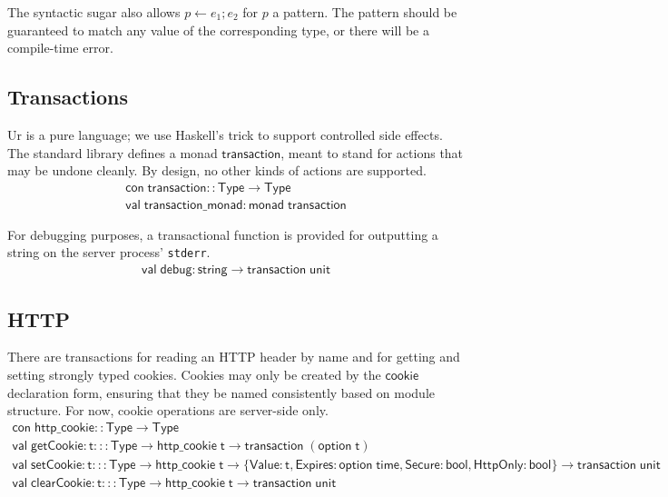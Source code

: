 \documentclass{article}
\newcommand{\mt}[1]{\mathsf{#1}}
\begin{document}
The syntactic sugar also allows $p \leftarrow e_1; e_2$ for $p$ a pattern.  The pattern should be guaranteed to match any value of the corresponding type, or there will be a compile-time error.

\subsection{Transactions}

Ur is a pure language; we use Haskell's trick to support controlled side effects.  The standard library defines a monad $\mt{transaction}$, meant to stand for actions that may be undone cleanly.  By design, no other kinds of actions are supported.
$$\begin{array}{l}
  \mt{con} \; \mt{transaction} :: \mt{Type} \to \mt{Type} \\
  \mt{val} \; \mt{transaction\_monad} : \mt{monad} \; \mt{transaction}
\end{array}$$

For debugging purposes, a transactional function is provided for outputting a string on the server process' \texttt{stderr}.
$$\begin{array}{l}
  \mt{val} \; \mt{debug} : \mt{string} \to \mt{transaction} \; \mt{unit}
\end{array}$$

\subsection{HTTP}

There are transactions for reading an HTTP header by name and for getting and setting strongly typed cookies.  Cookies may only be created by the $\mt{cookie}$ declaration form, ensuring that they be named consistently based on module structure.  For now, cookie operations are server-side only.
$$\begin{array}{l}
  \mt{con} \; \mt{http\_cookie} :: \mt{Type} \to \mt{Type} \\
  \mt{val} \; \mt{getCookie} : \mt{t} ::: \mt{Type} \to \mt{http\_cookie} \; \mt{t} \to \mt{transaction} \; (\mt{option} \; \mt{t}) \\
  \mt{val} \; \mt{setCookie} : \mt{t} ::: \mt{Type} \to \mt{http\_cookie} \; \mt{t} \to \{\mt{Value} : \mt{t}, \mt{Expires} : \mt{option} \; \mt{time}, \mt{Secure} : \mt{bool}, \mt{HttpOnly} : \mt{bool}\} \to \mt{transaction} \; \mt{unit} \\
  \mt{val} \; \mt{clearCookie} : \mt{t} ::: \mt{Type} \to \mt{http\_cookie} \; \mt{t} \to \mt{transaction} \; \mt{unit}
\end{array}$$
\end{document}
